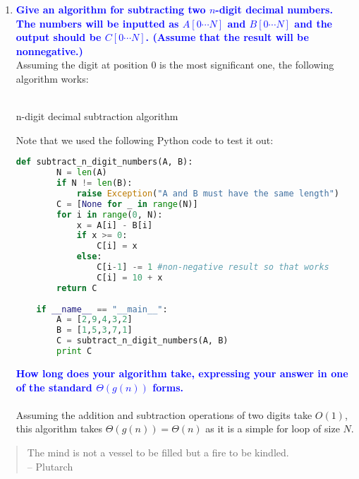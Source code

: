 \documentclass[11pt]{article}
\begin{document}
\begin{enumerate}
\item \textbf{\textcolor{blue}{Give an algorithm for subtracting two $n$-digit decimal numbers.
The numbers will be inputted as $A[0\cdots N]$ and $B[0\cdots N]$
and the output should be $C[0\cdots N]$.  (Assume that the result will
be nonnegative.)}}
    \\ Assuming the digit at position $0$ is the most significant one, the following algorithm works:
    \\\\
    \begin{algorithm}[H]
        \For{$i$ from $0$ to $N$}{
            X = A[i] - B[i]\
            \eIf{X >= 0}{
                C[i] = X\
            }{
                C[i-1]--\
                C[i] = 10 + X\
            }
        }
        \caption{n-digit decimal subtraction algorithm}
    \end{algorithm}
    Note that we used the following Python code to test it out:
    \begin{lstlisting}[language=Python]
    def subtract_n_digit_numbers(A, B):
        N = len(A)
        if N != len(B):
            raise Exception("A and B must have the same length")
        C = [None for _ in range(N)]
        for i in range(0, N):
            x = A[i] - B[i]
            if x >= 0:
                C[i] = x
            else:
                C[i-1] -= 1 #non-negative result so that works
                C[i] = 10 + x
        return C    
    
    if __name__ == "__main__":
        A = [2,9,4,3,2]
        B = [1,5,3,7,1]
        C = subtract_n_digit_numbers(A, B)
        print C
    \end{lstlisting}
    \newline

    \textbf{\textcolor{blue}{How long does your algorithm take, expressing
    your answer in one of the standard $\Theta(g(n))$ forms.}}
        \\\\Assuming the addition and subtraction operations of two digits take $O(1)$, this algorithm takes $\Theta(g(n))=\Theta(n)$ as it is a simple for loop of size $N$.
\end{enumerate}


\begin{quote}
The mind is not a vessel to be filled but a fire to be kindled.  \\ -- Plutarch
\end{quote}
\end{document}

